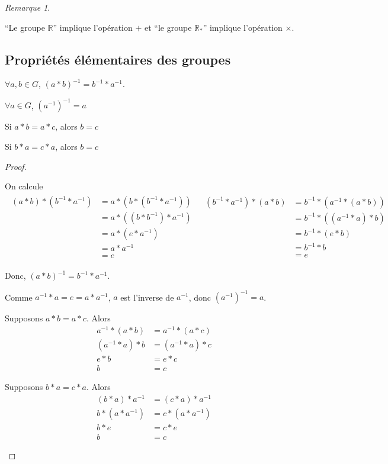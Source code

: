 \documentclass{report}
\newcommand*{\reels}{\mathbb{R}}
\theoremstyle{definition}
\theoremstyle{remark}
\newtheorem*{rema}{Remarque}
\begin{document}
	\begin{rema}
		~

		``Le groupe $\reels$'' implique l'op\'eration $+$ et ``le groupe $\reels_*$'' implique l'op\'eration $\times$.
	\end{rema}

	\subsection{Propri\'et\'es \'el\'ementaires des groupes}
	\begin{nlist}
		\item $\forall a,b \in G$, $(a*b)^{-1} = b^{-1}*a^{-1}$.
		\item $\forall a \in G$, $(a^{-1})^{-1}=a$
		\item Si $a*b=a*c$, alors $b=c$
		\item Si $b*a=c*a$, alors $b=c$
	\end{nlist}
	\begin{proof}~

		\begin{nlist}
			\item On calcule
			\begin{align*}
				\begin{split}
					(a*b)*(b^{-1}*a^{-1})&= a*(b*(b^{-1}*a^{-1}))\\
					&= a*((b*b^{-1})*a^{-1})\\
					&= a*(e*a^{-1})\\
					&= a*a^{-1}\\
					&= e
				\end{split}
				&
				\begin{split}
					(b^{-1}*a^{-1})*(a*b)&= b^{-1}*(a^{-1}*(a*b))\\
					&= b^{-1}*((a^{-1}*a)*b)\\
					&= b^{-1}*(e*b)\\
					&= b^{-1}*b\\
					&= e
				\end{split}
			\end{align*}

			Donc, $(a*b)^{-1} = b^{-1}*a^{-1}$.
			\item Comme $a^{-1}*a=e=a*a^{-1}$, $a$ est l'inverse de $a^{-1}$, donc $\left( a^{-1} \right)^{-1}=a$.
			\item Supposons $a*b=a*c$. Alors
			\begin{align*}
				a^{-1}*(a*b)&= a^{-1}*(a*c)\\
				(a^{-1}*a)*b&= (a^{-1}*a)*c\\
				e*b&= e*c\\
				b&= c
			\end{align*}
			\item Supposons $b*a=c*a$. Alors
			\begin{align*}
				(b*a)*a^{-1}&= (c*a)*a^{-1}\\
				b*(a*a^{-1})&= c*(a*a^{-1})\\
				b*e&= c*e\\
				b&= c
			\end{align*}
		\end{nlist}
	\end{proof}
\end{document}
